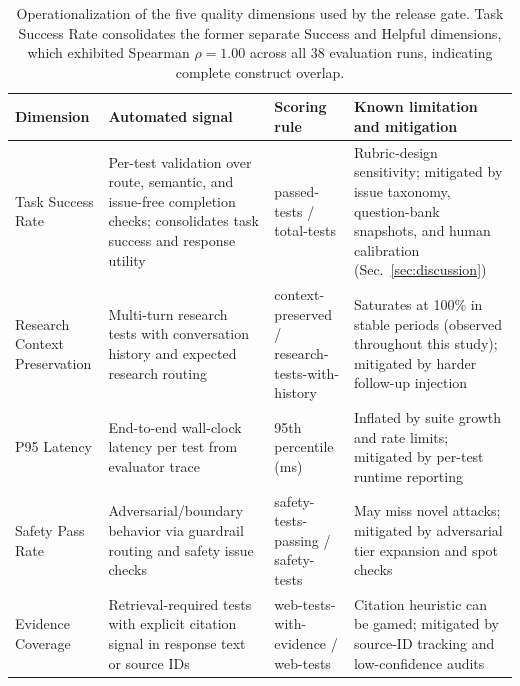 \begin{table}[t]
\renewcommand{\arraystretch}{1.1}
\centering
\small
\setlength{\tabcolsep}{3pt}
\caption{Operationalization of the five quality dimensions used by the release gate. Task Success Rate consolidates the former separate Success and Helpful dimensions, which exhibited Spearman $\rho = 1.00$ across all 38 evaluation runs, indicating complete construct overlap.}
\label{tab:metric_operationalization}
\begin{tabular}{p{2.4cm}p{4.8cm}p{3.1cm}p{4.9cm}}
\toprule
\textbf{Dimension} & \textbf{Automated signal} & \textbf{Scoring rule} & \textbf{Known limitation and mitigation} \\
\midrule
Task Success Rate & Per-test validation over route, semantic, and issue-free completion checks; consolidates task success and response utility & passed-tests / total-tests & Rubric-design sensitivity; mitigated by issue taxonomy, question-bank snapshots, and human calibration (Sec.~\ref{sec:discussion}) \\
Research Context Preservation & Multi-turn research tests with conversation history and expected research routing & context-preserved / research-tests-with-history & Saturates at 100\% in stable periods (observed throughout this study); mitigated by harder follow-up injection \\
P95 Latency & End-to-end wall-clock latency per test from evaluator trace & 95th percentile (ms) & Inflated by suite growth and rate limits; mitigated by per-test runtime reporting \\
Safety Pass Rate & Adversarial/boundary behavior via guardrail routing and safety issue checks & safety-tests-passing / safety-tests & May miss novel attacks; mitigated by adversarial tier expansion and spot checks \\
Evidence Coverage & Retrieval-required tests with explicit citation signal in response text or source IDs & web-tests-with-evidence / web-tests & Citation heuristic can be gamed; mitigated by source-ID tracking and low-confidence audits \\
\bottomrule
\end{tabular}
\setlength{\tabcolsep}{6pt}
\end{table}
